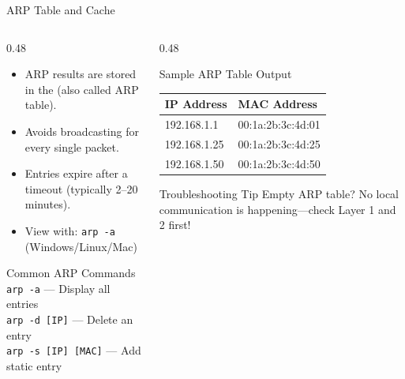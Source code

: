 \documentclass[aspectratio=169]{beamer}  %
\begin{document}
\begin{frame}{ARP Table and Cache}
    \begin{columns}[T]
        \begin{column}{0.48\textwidth}
            \begin{itemize}
                \item ARP results are stored in the  (also called ARP table).
                \item Avoids broadcasting for every single packet.
                \item Entries expire after a timeout (typically 2--20 minutes).
                \item View with: \texttt{arp -a} (Windows/Linux/Mac)
            \end{itemize}
            
            \vspace{0.3em}
            \begin{block}{Common ARP Commands}
                \small
                \texttt{arp -a} --- Display all entries \\
                \texttt{arp -d [IP]} --- Delete an entry \\
                \texttt{arp -s [IP] [MAC]} --- Add static entry
            \end{block}
        \end{column}
        \begin{column}{0.48\textwidth}
            \begin{block}{Sample ARP Table Output}
                \ttfamily\small
                \begin{tabular}{l l}
                    \textbf{IP Address} & \textbf{MAC Address} \\
                    \midrule
                    192.168.1.1 & 00:1a:2b:3c:4d:01 \\
                    192.168.1.25 & 00:1a:2b:3c:4d:25 \\
                    192.168.1.50 & 00:1a:2b:3c:4d:50 \\
                \end{tabular}
            \end{block}
            
            \vspace{0.3em}
            \begin{alertblock}{Troubleshooting Tip}
                Empty ARP table? No local communication is happening---check Layer 1 and 2 first!
            \end{alertblock}
        \end{column}
    \end{columns}
\end{frame}
\end{document}

